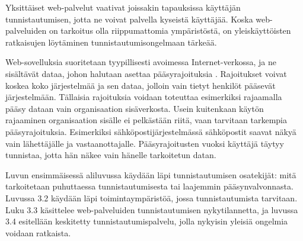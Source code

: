 Yksittäiset web-palvelut vaativat joissakin tapauksissa käyttäjän tunnistautumisen, jotta ne voivat palvella kyseistä käyttäjää. Koska web-palveluiden on tarkoitus olla riippumattomia ympäristöstä, on yleiskäyttöisten ratkaisujen löytäminen tunnistautumisongelmaan tärkeää.

Web-sovelluksia suoritetaan tyypillisesti avoimessa Internet-verkossa, ja ne sisältävät dataa, johon halutaan asettaa pääsyrajoituksia \cite{inside_the_identity_management_game}. Rajoitukset voivat koskea koko järjestelmää ja sen dataa, jolloin vain tietyt henkilöt pääsevät järjestelmään. Tällaisia rajoituksia voidaan toteuttaa esimerkiksi rajaamalla pääsy dataan vain organisaation sisäverkosta. Usein kuitenkaan käytön rajaaminen organisaation sisälle ei pelkästään riitä, vaan tarvitaan tarkempia pääsyrajoituksia. Esimerkiksi sähköpostijärjestelmässä sähköpostit saavat näkyä vain lähettäjälle ja vastaanottajalle. Pääsyrajoitusten vuoksi käyttäjä täytyy tunnistaa, jotta hän näkee vain hänelle tarkoitetun datan.

Luvun ensimmäisessä aliluvussa käydään läpi tunnistautumisen osatekijät: mitä tarkoitetaan puhuttaessa tunnistautumisesta tai laajemmin pääsynvalvonnasta. Luvussa 3.2 käydään läpi toimintaympäristöä, jossa tunnistautumista tarvitaan. Luku 3.3 käsittelee web-palveluiden tunnistautumisen nykytilannetta, ja luvussa 3.4 esitellään keskitetty tunnistautumispalvelu, jolla nykyisin yleisiä ongelmia voidaan ratkaista.
